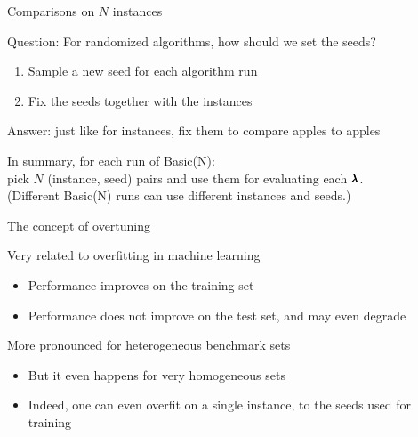 \begin{frame}[c]{Comparisons on $N$ instances }

Question: For randomized algorithms, how should we set the seeds? 
\begin{enumerate}
\item Sample a new seed for each algorithm run
\item Fix the seeds together with the instances
\end{enumerate}
\bigskip
\pause
Answer: just like for instances, fix them to compare apples to apples

\bigskip
\pause
In summary, for each run of Basic(N): \\pick $N$ (instance, seed) pairs and use them for evaluating each $\pmb{\lambda}$.\\
\pause
(Different Basic(N) runs can use different instances and seeds.)

\end{frame}


\begin{frame}[c]{The concept of overtuning}

Very related to overfitting in machine learning 
\begin{itemize}
\item Performance improves on the training set
\item Performance does not improve on the test set, and may even degrade
\end{itemize}	

\pause
\medskip

More pronounced for heterogeneous benchmark sets 
\begin{itemize}
\item But it even happens for very homogeneous sets
\item Indeed, one can even overfit on a single instance, to the \alert{seeds} used for training 
\end{itemize}	

\end{frame}

